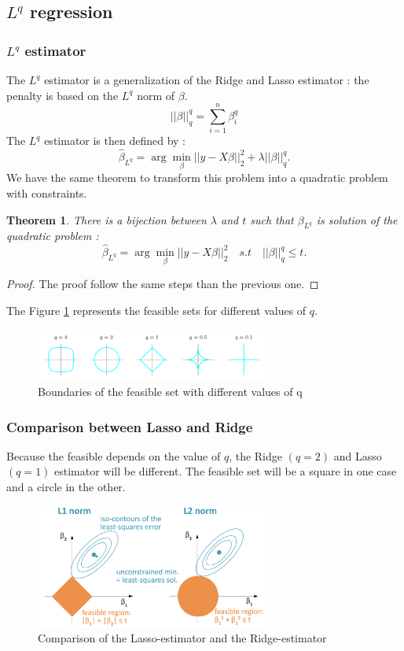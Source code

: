 \documentclass[a4paper,12pt]{article}
\newtheorem*{thm}{Theorem}
\begin{document}
\subsection{$L^q$ regression}
\subsubsection{$L^q$ estimator}
The $L^q$ estimator is a generalization of the Ridge and Lasso estimator : the penalty is based on the $L^q$ norm of $\beta$.\\
\[||\beta||_q^q = \sum_{i = 1}^{n}{\beta_{i}^q}\]
The $L^q$ estimator is then defined by :
\[ \hat{\beta}_\text{$L^q$} = \arg \min_\beta ||y - X\beta||_2^2 + \lambda ||\beta||_q^q. \]
We have the same theorem to transform this problem into a quadratic problem with constraints.\\

\begin{thm} There is a bijection between $\lambda$ and $t$ such that ${\beta}_\text{$L^q$}$ is solution of the quadratic problem : 
\[ \hat{\beta}_\text{$L^q$} = \arg \min_\beta ||y - X\beta||_2^2 \quad s.t \quad ||\beta||_q^q\leq t. \]
\end{thm}

\begin{proof}
The proof follow the same steps than the previous one.
\end{proof}

The Figure \ref{Bound2} represents the feasible sets for different values of $q$.
\begin{figure}[!h]
\centerline{
\includegraphics[width = 0.7\textwidth]{figures/bound.png}}
\caption{Boundaries of the feasible set with different values of q}
\label{Bound2}
\end{figure}

\subsubsection{Comparison between Lasso and Ridge}
Because the feasible depends on the value of $q$, the Ridge $(q = 2)$ and Lasso $(q = 1)$ estimator will be different. The feasible set will be a square in one case and a circle in the other.
\begin{figure}[!h]
\centerline{
\includegraphics[width = 0.7\textwidth]{figures/comparison.png}}
\caption{Comparison of the Lasso-estimator and the Ridge-estimator}
\label{Comparison}
\end{figure}
\end{document}
